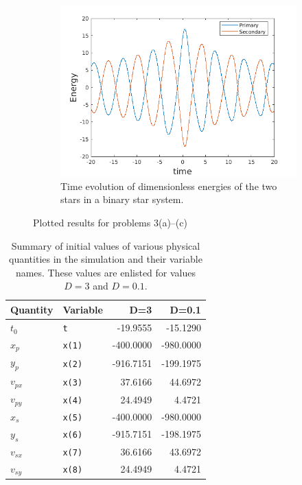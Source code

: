 \documentclass[a4paper]{article}
\begin{document}
\begin{figure} [h]
				\begin{subfigure} {\columnwidth}
					\centering
					\includegraphics[width=.5\columnwidth]{../plots/3c_energy.png}
					\caption{Time evolution of dimensionless energies of the two stars in a binary star system.}
					\label{fig:3c}
				\end{subfigure}
				\caption{Plotted results for problems 3(a)--(c)}
				\label{fig:3.1}
			\end{figure}
			
			
			\begin{table}
				\centering
				\begin{tabular} {l l r r}
					\toprule
					\textbf{Quantity} & \textbf{Variable} & \textbf{D=3} & \textbf{D=0.1}\\
					\midrule
					\(t^{}_{0}\) & \texttt{t} & -19.9555 & -15.1290 \\
					\(x^{}_{p}\) & \texttt{x(1)}& -400.0000 & -980.0000 \\
					\(y^{}_{p}\) & \texttt{x(2)} & -916.7151 & -199.1975 \\
					\(v^{}_{px}\) & \texttt{x(3)} & 37.6166 & 44.6972 \\
					\(v^{}_{py}\) & \texttt{x(4)} & 24.4949 & 4.4721 \\
					\(x^{}_{s}\) & \texttt{x(5)} & -400.0000 & -980.0000 \\
					\(y^{}_{s}\) & \texttt{x(6)} & -915.7151 & -198.1975 \\
					\(v^{}_{sx}\) & \texttt{x(7)} & 36.6166 & 43.6972 \\
					\(v^{}_{sy}\) & \texttt{x(8)} & 24.4949 & 4.4721 \\
					\bottomrule
				\end{tabular}
				\caption{Summary of initial values of various physical quantities in the simulation and their variable names. These values are enlisted for values \(D=3\) and \(D=0.1\).}
				\label{table:3_dvalues}
			\end{table}
			
			
			
\end{document}
